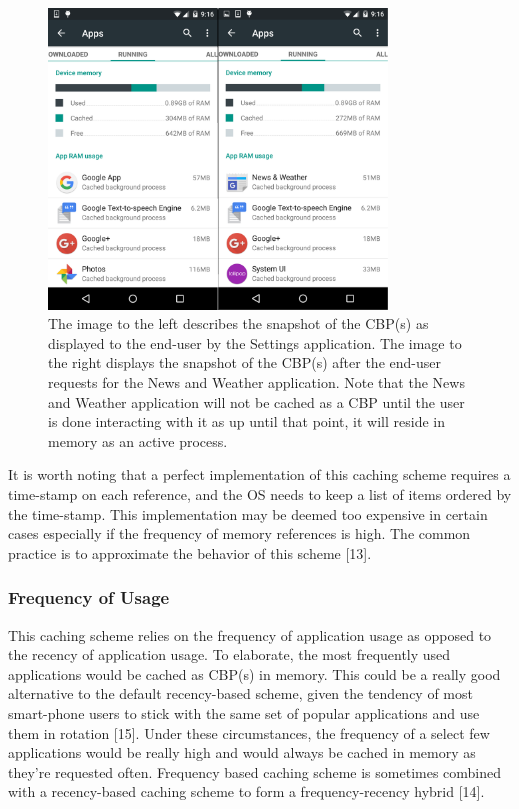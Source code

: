\documentclass[12pt]{uthesis-v12}  %
\begin{document}
				\begin{figure}[!ht]
					\centering
					\includegraphics[width = 90mm]{images/beforeAndAfterNews.png}
					\caption[Before \& After News Application Launch]
					{The image to the left describes the snapshot of the CBP(s) as displayed to the end-user by the Settings application. The image to the right displays the snapshot of the CBP(s) after the end-user requests for the News and Weather application. Note that the News and Weather application will not be cached as a CBP until the user is done interacting with it as up until that point, it will reside in memory as an active process.}
				\end{figure}				
				
				It is worth noting that a perfect implementation of this caching scheme requires a time-stamp on each reference, and the OS needs to keep a list of items ordered by the time-stamp. This implementation may be deemed too expensive in certain cases especially if the frequency of memory references is high. The common practice is to approximate the behavior of this scheme [13].
			
			\subsubsection{Frequency of Usage}
				This caching scheme relies on the frequency of application usage as opposed to the recency of application usage. To elaborate, the most frequently used applications would be cached as CBP(s) in memory. This could be a really good alternative to the default recency-based scheme, given the tendency of most smart-phone users to stick with the same set of popular applications and use them in rotation [15]. Under these circumstances, the frequency of a select few applications would be really high and would always be cached in memory as they're requested often. Frequency based caching scheme is sometimes combined with a recency-based caching scheme to form a frequency-recency hybrid [14].
				 
\end{document}
